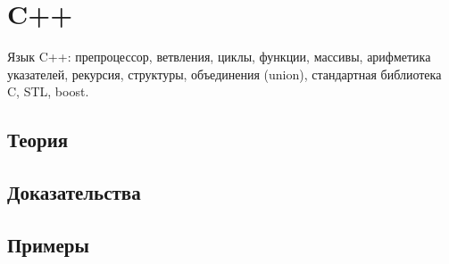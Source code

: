 
\section{C++}
\label{sec:2.3b.02-cpp}

\begin{ticket}
Язык C++: препроцессор, ветвления, циклы, функции, массивы, арифметика указателей, рекурсия, структуры, объединения (union), стандартная библиотека C, STL, boost.
\end{ticket}

\subsection*{Теория}

\subsection*{Доказательства}

\subsection*{Примеры}
